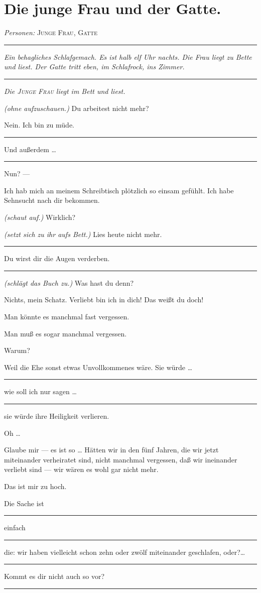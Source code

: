 \documentclass[
	final,
	a4paper,
	ngerman,
	mpinclude = true, %
	twoside = true,
	open = right,
	cleardoublepage = plain,
	DIV = 13,
	BCOR = 1cm,
	titlepage = firstiscover,
	]{scrbook}
\newcommand{\scene}{\section}
\newcommand{\direction}[1]{\textit{(#1)}}
\newcommand{\setting}[1]{\vspace{-0.5\baselineskip}\centering\textit{#1}}
\newenvironment{deletion}{%
		\vspace{0.25\baselineskip}
		\hrule
		\vspace{0.25\baselineskip}
		\color{darkgray}
	}{
		\color{black}
		\vspace{0.25\baselineskip}
		\hrule 
		\vspace{0.25\baselineskip}
	}
\newcommand{\characterlist}[1]{{\begin{center}\textit{Personen:} #1\end{center}}}
\newcommand{\thecharacter}[1]{\textup{\textsc{#1}}\xspace}
\newcommand{\thefrau}{\thecharacter{Junge Frau}}
\newcommand{\thegatte}{\thecharacter{Gatte}}
\newcommand{\character}[1]{\item[#1:]}
\newcommand{\frau}{\character{\thefrau}}
\newcommand{\gatte}{\character{\thegatte}}
\begin{document}
\scene{Die junge Frau und der Gatte.}
\characterlist{\thefrau, \thegatte}
\begin{deletion}
\setting{Ein behagliches Schlafgemach. Es ist halb elf Uhr nachts. Die Frau liegt zu Bette und liest. Der Gatte tritt eben, im Schlafrock, ins Zimmer.}
\end{deletion}
\setting{Die \thefrau liegt im Bett und liest.}

\begin{play}

	\frau
	\direction{ohne aufzuschauen.} Du arbeitest nicht mehr?

	\gatte
	Nein. Ich bin zu müde.
	\begin{deletion}
	Und außerdem \ldots{}
	\end{deletion}

	\frau
	Nun? ---

	\gatte
	Ich hab mich an meinem Schreibtisch plötzlich so einsam gefühlt. Ich habe Sehnsucht nach dir bekommen.

	\frau
	\direction{schaut auf.} Wirklich?

	\gatte
	\direction{setzt sich zu ihr aufs Bett.} Lies heute nicht mehr.
	\begin{deletion}
	Du wirst dir die Augen verderben.
	\end{deletion}

	\frau
	\direction{schlägt das Buch zu.} Was hast du denn?

	\gatte
	Nichts, mein Schatz. Verliebt bin ich in dich! Das weißt du doch!

	\frau
	Man könnte es manchmal fast vergessen.

	\gatte
	Man muß es sogar manchmal vergessen.

	\frau
	Warum?

	\gatte
	Weil die Ehe sonst etwas Unvollkommenes wäre. Sie würde \ldots{}
	\begin{deletion}
		wie soll ich nur sagen \ldots{}
	\end{deletion}
	sie würde ihre Heiligkeit verlieren.

	\frau
	Oh \ldots{}

	\gatte
	Glaube mir --- es ist so \ldots{} Hätten wir in den fünf Jahren, die wir jetzt miteinander verheiratet sind, nicht manchmal vergessen, daß wir ineinander verliebt sind --- wir wären es wohl gar nicht mehr.

	\frau
	Das ist mir zu hoch.

	\gatte
	Die Sache ist
	\begin{deletion}
		einfach
	\end{deletion}
	die: wir haben vielleicht schon zehn oder zwölf miteinander geschlafen, oder?\ldots{}
	\begin{deletion}
		Kommt es dir nicht auch so vor?
	\end{deletion}


\end{play}
\end{document}
